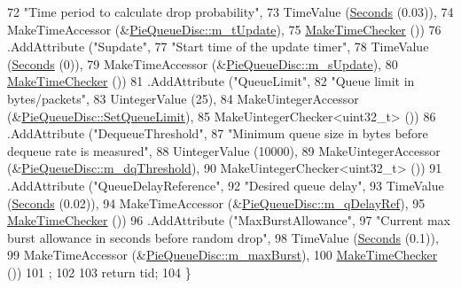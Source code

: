 \begin{DoxyCode}
72                    \textcolor{stringliteral}{"Time period to calculate drop probability"},
73                    TimeValue (\hyperlink{group__timecivil_ga33c34b816f8ff6628e33d5c8e9713b9e}{Seconds} (0.03)),
74                    MakeTimeAccessor (&\hyperlink{classns3_1_1PieQueueDisc_abf2ddf0a8be15f28fab235144118b06c}{PieQueueDisc::m\_tUpdate}),
75                    \hyperlink{group__time_ga7032965bd4afa578691d88c09e4481c1}{MakeTimeChecker} ())
76     .AddAttribute (\textcolor{stringliteral}{"Supdate"},
77                    \textcolor{stringliteral}{"Start time of the update timer"},
78                    TimeValue (\hyperlink{group__timecivil_ga33c34b816f8ff6628e33d5c8e9713b9e}{Seconds} (0)),
79                    MakeTimeAccessor (&\hyperlink{classns3_1_1PieQueueDisc_a25258274d61df8126b68fae4398a0918}{PieQueueDisc::m\_sUpdate}),
80                    \hyperlink{group__time_ga7032965bd4afa578691d88c09e4481c1}{MakeTimeChecker} ())
81     .AddAttribute (\textcolor{stringliteral}{"QueueLimit"},
82                    \textcolor{stringliteral}{"Queue limit in bytes/packets"},
83                    UintegerValue (25),
84                    MakeUintegerAccessor (&\hyperlink{classns3_1_1PieQueueDisc_a2a3d97fd3ad7ea6f486e090c1f772476}{PieQueueDisc::SetQueueLimit}),
85                    MakeUintegerChecker<uint32\_t> ())
86     .AddAttribute (\textcolor{stringliteral}{"DequeueThreshold"},
87                    \textcolor{stringliteral}{"Minimum queue size in bytes before dequeue rate is measured"},
88                    UintegerValue (10000),
89                    MakeUintegerAccessor (&\hyperlink{classns3_1_1PieQueueDisc_a010bb75fa254f100eece3b71825aa5cc}{PieQueueDisc::m\_dqThreshold}),
90                    MakeUintegerChecker<uint32\_t> ())
91     .AddAttribute (\textcolor{stringliteral}{"QueueDelayReference"},
92                    \textcolor{stringliteral}{"Desired queue delay"},
93                    TimeValue (\hyperlink{group__timecivil_ga33c34b816f8ff6628e33d5c8e9713b9e}{Seconds} (0.02)),
94                    MakeTimeAccessor (&\hyperlink{classns3_1_1PieQueueDisc_aa5aef7970bc5164248e2bc2a4b024f60}{PieQueueDisc::m\_qDelayRef}),
95                    \hyperlink{group__time_ga7032965bd4afa578691d88c09e4481c1}{MakeTimeChecker} ())
96     .AddAttribute (\textcolor{stringliteral}{"MaxBurstAllowance"},
97                    \textcolor{stringliteral}{"Current max burst allowance in seconds before random drop"},
98                    TimeValue (\hyperlink{group__timecivil_ga33c34b816f8ff6628e33d5c8e9713b9e}{Seconds} (0.1)),
99                    MakeTimeAccessor (&\hyperlink{classns3_1_1PieQueueDisc_a3eed3c319ffb19556aedd333da047954}{PieQueueDisc::m\_maxBurst}),
100                    \hyperlink{group__time_ga7032965bd4afa578691d88c09e4481c1}{MakeTimeChecker} ())
101   ;
102 
103   \textcolor{keywordflow}{return} tid;
104 \}
\end{DoxyCode}


